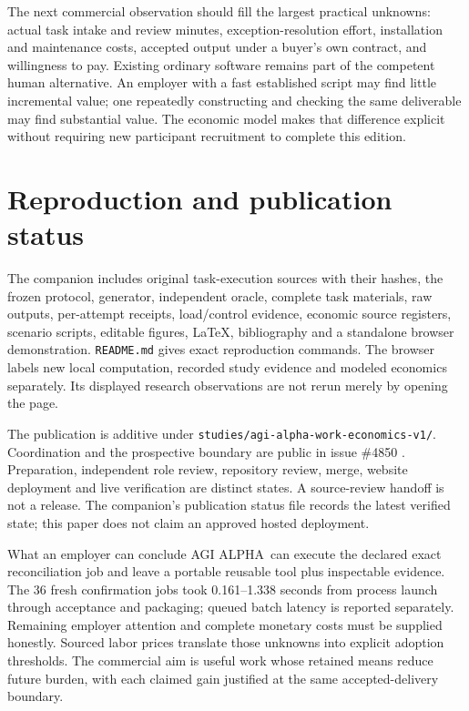 \documentclass[11pt,a4paper]{article}
\newcommand{\Alpha}{AGI ALPHA}
\newcommand{\code}[1]{\texttt{\small #1}}
\begin{document}
The next commercial observation should fill the largest practical unknowns: actual task intake and review minutes, exception-resolution effort, installation and maintenance costs, accepted output under a buyer's own contract, and willingness to pay. Existing ordinary software remains part of the competent human alternative. An employer with a fast established script may find little incremental value; one repeatedly constructing and checking the same deliverable may find substantial value. The economic model makes that difference explicit without requiring new participant recruitment to complete this edition.

\section{Reproduction and publication status}

The companion includes original task-execution sources with their hashes, the frozen protocol, generator, independent oracle, complete task materials, raw outputs, per-attempt receipts, load/control evidence, economic source registers, scenario scripts, editable figures, LaTeX, bibliography and a standalone browser demonstration. \code{README.md} gives exact reproduction commands. The browser labels new local computation, recorded study evidence and modeled economics separately. Its displayed research observations are not rerun merely by opening the page.

The publication is additive under \code{studies/agi-alpha-work-economics-v1/}. Coordination and the prospective boundary are public in issue \#4850 \citep{study_coordination,study_freeze}. Preparation, independent role review, repository review, merge, website deployment and live verification are distinct states. A source-review handoff is not a release. The companion's publication status file records the latest verified state; this paper does not claim an approved hosted deployment.

\begin{evidencebox}{What an employer can conclude}
\Alpha\ can execute the declared exact reconciliation job and leave a portable reusable tool plus inspectable evidence. The 36 fresh confirmation jobs took 0.161--1.338 seconds from process launch through acceptance and packaging; queued batch latency is reported separately. Remaining employer attention and complete monetary costs must be supplied honestly. Sourced labor prices translate those unknowns into explicit adoption thresholds. The commercial aim is useful work whose retained means reduce future burden, with each claimed gain justified at the same accepted-delivery boundary.
\end{evidencebox}
\end{document}
